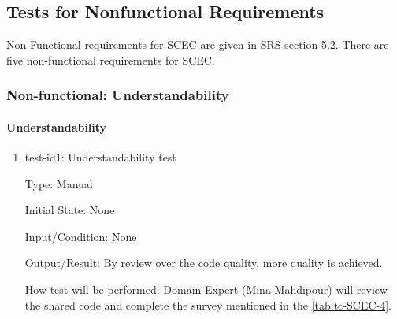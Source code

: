 \documentclass[12pt, titlepage]{article}
\begin{document}
\subsection{Tests for Nonfunctional Requirements}

Non-Functional requirements for SCEC are given in \href{https://github.com/DeeshaPatel/CAS-741-Solar-Cooker/blob/7c53c8d9a19ca2f94dfba6ba9208eae0bf03b8cc/docs/SRS/SRS.pdf}{SRS} section 5.2. There are five non-functional requirements for SCEC. 




\subsubsection{Non-functional: Understandability}
\label{non_functional_understandability}		
\paragraph{Understandability}

\begin{enumerate}

\item{test-id1: Understandability test\\}

Type: Manual
					
Initial State: None
					
Input/Condition: None
					
Output/Result: By review over the code quality, more quality is achieved. 
					
How test will be performed: Domain Expert (Mina Mahdipour) will review the shared code and complete the survey mentioned in the \autoref{tab:tc-SCEC-4}.   

\begin{center}
\begin{table}[h!]
\caption{TC-SCEC-4 - Understandability test survey}
\label{tab:tc-SCEC-4}
\end{table}
\end{center}

\end{enumerate}
\end{document}

